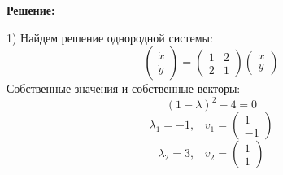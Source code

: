 \documentclass[10pt]{report}
\begin{document}
\textbf{Решение:} 

1) Найдем решение однородной системы:
\[\left(
\begin{array}{c}
\dot{x}\\
\dot{y}
\end{array}\right)=
\left(
\begin{array}{cc}
1 & 2 \\
2 & 1
\end{array}\right)
\left(
\begin{array}{c}
x\\
y
\end{array}\right)\]
Собственные значения и собственные векторы:
\[(1-\lambda)^2-4=0\]
\[\lambda_1=-1, \;\;\; v_1=\left(
\begin{array}{c}
1\\
-1
\end{array}\right)\]
\[\lambda_2=3, \;\;\; v_2=\left(
\begin{array}{c}
1\\
1
\end{array}\right)\]
\end{document}
